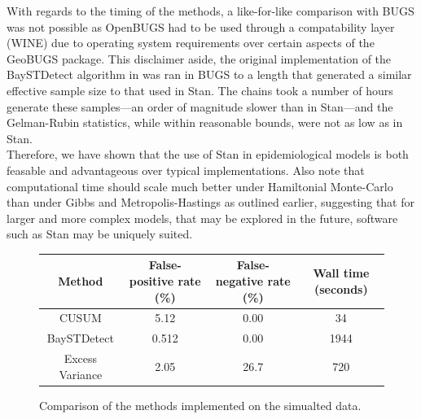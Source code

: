 \documentclass[11pt]{report}
\begin{document}
With regards to the timing of the methods, a like-for-like comparison with BUGS was not possible as OpenBUGS had to be used through a compatability layer (WINE) due to operating system requirements over certain aspects of the GeoBUGS package. This disclaimer aside, the original implementation of the BaySTDetect algorithm in \citet{baystdetect} was ran in BUGS to a length that generated a similar effective sample size to that used in Stan. The chains took a number of hours generate these samples---an order of magnitude slower than in Stan---and the Gelman-Rubin statistics, while within reasonable bounds, were not as low as in Stan. \\

Therefore, we have shown that the use of Stan in epidemiological models is both feasable and advantageous over typical implementations. Also note that computational time should scale much better under Hamiltonial Monte-Carlo than under Gibbs and Metropolis-Hastings as outlined earlier, suggesting that for larger and more complex models, that may be explored in the future, software such as Stan may be uniquely suited.

\bgroup
\def\arraystretch{1.5}%
\begin{figure}
\centering
\begin{tabular}{| c | c | c | c |}
\hline
Method & False-positive rate (\%) & False-negative rate (\%) & Wall time (seconds) \\ \hline
CUSUM & 5.12 & 0.00 & 34 \\ \hline
BaySTDetect & 0.512 & 0.00 & 1944 \\ \hline
Excess Variance & 2.05 & 26.7 & 720 \\
\hline
\end{tabular}
\label{fig:table}
\caption{Comparison of the methods implemented on the simualted data.}
\end{figure}
\egroup

\printbibliography
\end{document}
